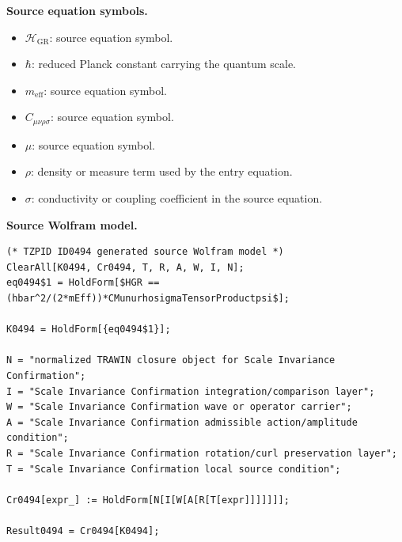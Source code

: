 \begin{minipage}[t]{0.49\linewidth}
\begingroup
\small
\raggedright
\textbf{Source equation symbols.}\par
\begin{itemize}[leftmargin=1.35em,itemsep=1pt,topsep=1pt,parsep=0pt]
    \item $\mathcal{H}_{\mathrm{GR}}$: source equation symbol.
    \item $\hbar$: reduced Planck constant carrying the quantum scale.
    \item $m_{\mathrm{eff}}$: source equation symbol.
    \item $C_{\mu\nu\rho\sigma}$: source equation symbol.
    \item $\mu$: source equation symbol.
    \item $\rho$: density or measure term used by the entry equation.
    \item $\sigma$: conductivity or coupling coefficient in the source equation.
\end{itemize}
\endgroup
\end{minipage}\hfill
\begin{minipage}[t]{0.47\linewidth}
\begingroup
\scriptsize
\raggedright
\textbf{Source Wolfram model.}\par
\begin{Verbatim}[fontsize=\tiny,breaklines=true,breakanywhere=true]
(* TZPID ID0494 generated source Wolfram model *)
ClearAll[K0494, Cr0494, T, R, A, W, I, N];
eq0494$1 = HoldForm[$HGR == (hbar^2/(2*mEff))*CMunurhosigmaTensorProductpsi$];

K0494 = HoldForm[{eq0494$1}];

N = "normalized TRAWIN closure object for Scale Invariance Confirmation";
I = "Scale Invariance Confirmation integration/comparison layer";
W = "Scale Invariance Confirmation wave or operator carrier";
A = "Scale Invariance Confirmation admissible action/amplitude condition";
R = "Scale Invariance Confirmation rotation/curl preservation layer";
T = "Scale Invariance Confirmation local source condition";

Cr0494[expr_] := HoldForm[N[I[W[A[R[T[expr]]]]]]];

Result0494 = Cr0494[K0494];
\end{Verbatim}
\endgroup
\end{minipage}


